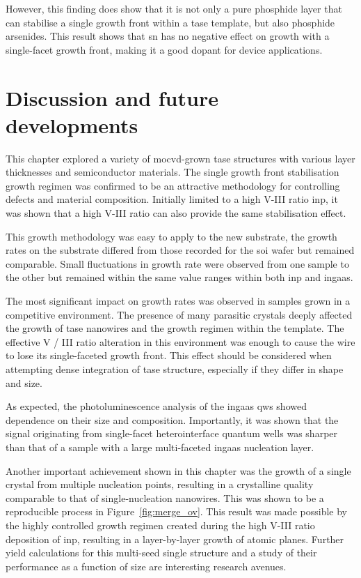 However, this finding does show that it is not only a pure phosphide layer that can stabilise a single  growth front within a \acs{tase} template, but also phosphide arsenides. This result shows that \acl{sn} has no negative effect on growth with a single-facet growth front, making it a good dopant for device applications.

\section{Discussion and future developments}

This chapter explored a variety of \acs{mocvd}-grown \acs{tase} structures with various layer thicknesses and semiconductor materials. The  single growth front stabilisation growth regimen was confirmed to be an attractive methodology for controlling defects and material composition. Initially limited to a high V-III ratio \acs{inp}, it was shown that a high V-III ratio  can also provide the same  stabilisation effect. 

This growth methodology was easy to apply to the new substrate, the growth rates on the  substrate differed from those recorded for the  \acs{soi} wafer but remained comparable. Small fluctuations in growth rate were observed from one sample to the other but remained within the same value ranges within both \acs{inp} and \acs{ingaas}. 

The most significant impact on growth rates was observed in samples grown in a competitive environment. The presence of many parasitic crystals deeply affected the growth of \acs{tase} nanowires and the growth regimen within the template. The effective V / III ratio alteration in this environment was enough to cause the wire to lose its single-faceted growth front. This effect should be considered when attempting dense integration of \acs{tase} structure, especially if they differ in shape and size.

As expected, the photoluminescence analysis of the \acs{ingaas} \acs{qw}s showed dependence on their size and composition. Importantly, it was shown that the signal originating from  single-facet heterointerface quantum wells was sharper than that of a sample with a large multi-faceted \acs{ingaas} nucleation layer.

Another important achievement shown in this chapter was the growth of a single crystal from multiple nucleation points, resulting in a crystalline quality comparable to that of single-nucleation nanowires. This was shown to be a reproducible process in Figure~\ref{fig:merge_ov}. This result was made possible by the highly controlled growth regimen created during the high V-III ratio deposition of \acs{inp}, resulting in a layer-by-layer growth of  atomic planes. Further yield calculations for this multi-seed single structure and a study of their performance as a function of size are interesting research avenues. 

